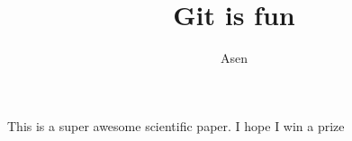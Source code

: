 \documentclass[10pt]{article}
\author{Asen}
\title{Git is fun}
\begin{document}
		\maketitle

		This is a super awesome scientific paper.
		I hope I win a prize
\end{document}
